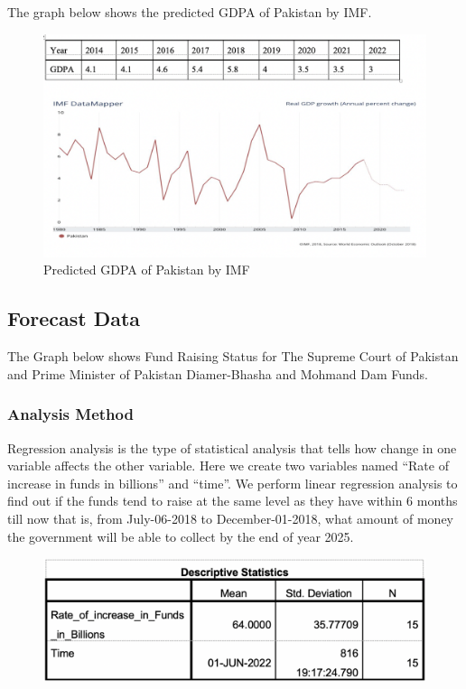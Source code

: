 \documentclass[11pt, journal,letterpaper,compsoc]{IEEEtran}
\begin{document}
The graph below shows the predicted GDPA of Pakistan by IMF. \\
\begin{figure}  [h!]
\includegraphics[width=\linewidth]{images/gdpa-imf}
 \caption{Predicted GDPA of Pakistan by IMF}
\end{figure}

\subsection{Forecast Data}

The Graph below  shows Fund Raising Status for The Supreme Court of Pakistan and Prime Minister of Pakistan Diamer-Bhasha and Mohmand Dam Funds.\\

\subsubsection{Analysis Method} 
Regression analysis is the type of statistical analysis that tells how change in one variable affects the other variable. Here we create two variables named “Rate of increase in funds in billions” and “time”.
We perform linear regression analysis to find out if the funds tend to raise at the same level as they have within 6 months till now that is, from July-06-2018 to December-01-2018, what amount of money the government will be able to collect by the end of year 2025.

\begin{figure}  [h!]
\includegraphics[width=\linewidth]{images/descriptive-statistics}
\end{figure}
\end{document}
